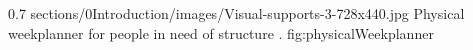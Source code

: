         {0.7} %
        {sections/0Introduction/images/Visual-supports-3-728x440.jpg} %
        {Physical weekplanner for people in need of structure \citep{cite:PhysicalWeeknaplnner}.} %
        {fig:physicalWeekplanner} %









